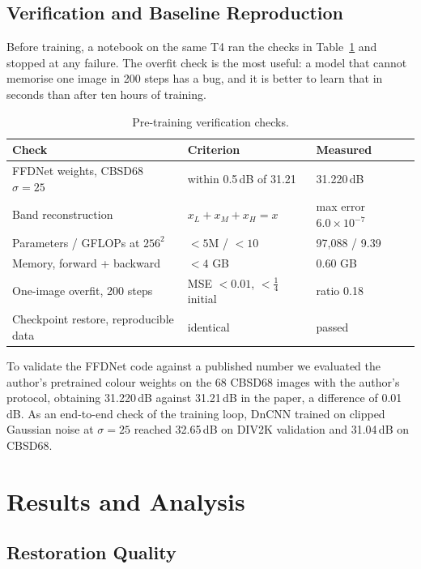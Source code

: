 \documentclass[12pt,a4paper,oneside]{NITR}
\newcommand{\dB}{\,dB}
\begin{document}
\section{Verification and Baseline Reproduction}\label{sec:verification}

Before training, a notebook on the same T4 ran the checks in
Table~\ref{tab:gates} and stopped at any failure. The overfit check is the
most useful: a model that cannot memorise one image in 200 steps has a bug,
and it is better to learn that in seconds than after ten hours of training.

\begin{table}[htbp]
	\centering
	\caption{Pre-training verification checks.}
	\label{tab:gates}
	\small
	\begin{tabular}{@{}lll@{}}
		\toprule
		Check & Criterion & Measured \\
		\midrule
		FFDNet weights, CBSD68 $\sigma{=}25$ & within 0.5\dB{} of 31.21 & 31.220\dB \\
		Band reconstruction & $x_L{+}x_M{+}x_H = x$ & max error $6.0\times10^{-7}$ \\
		Parameters / GFLOPs at $256^2$ & $<5$M / $<10$ & 97,088 / 9.39 \\
		Memory, forward + backward & $< 4$ GB & 0.60 GB \\
		One-image overfit, 200 steps & MSE $<0.01$, $<\frac14$ initial & ratio 0.18 \\
		Checkpoint restore, reproducible data & identical & passed \\
		\bottomrule
	\end{tabular}
\end{table}

To validate the FFDNet code against a published number we evaluated the
author's pretrained colour weights \cite{zhang2018ffdnet} on the 68 CBSD68 images with the author's protocol, obtaining 31.220\dB{}
against 31.21\dB{} in the paper, a difference of 0.01\dB{}. As an end-to-end
check of the training loop, DnCNN trained on clipped Gaussian noise at
$\sigma=25$ reached 32.65\dB{} on DIV2K validation and 31.04\dB{} on CBSD68.


\chapter{Results and Analysis}\label{ch:results}

\section{Restoration Quality}\label{sec:main-table}
\end{document}
